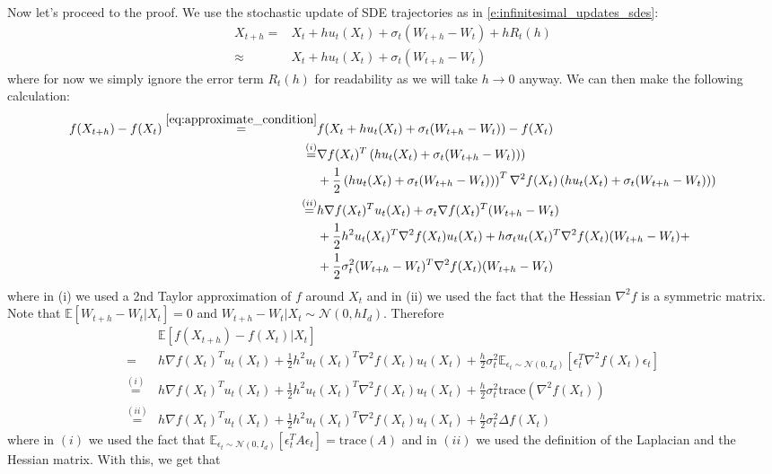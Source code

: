 Now let's proceed to the proof. We use the stochastic update of SDE trajectories as in \cref{e:infinitesimal_updates_sdes}:
\begin{align}
    X_{t+h} =& X_{t}+hu_t(X_t) + \sigma_t(W_{t+h}-W_{t})+hR_t(h)\\
    \label{eq:approximate_condition}
    \approx &X_{t}+hu_t(X_t) + \sigma_t(W_{t+h}-W_{t})
\end{align}
where for now we simply ignore the error term $R_t(h)$ for readability as we will take $h\to 0$ anyway. We can then make the following calculation:
\begin{align*}
f(X_{t+h})-f(X_t)\overset{\eqref{eq:approximate_condition}}{=}&f(X_{t}+hu_t(X_t) + \sigma_t(W_{t+h}-W_{t}))-f(X_t)\\
\overset{(i)}{=}&\nabla f(X_t)^T\left(hu_t(X_t) + \sigma_t(W_{t+h}-W_{t}))\right)\\&+\frac{1}{2}\left(hu_t(X_t) + \sigma_t(W_{t+h}-W_{t}))\right)^T\nabla^2 f(X_t)\left(hu_t(X_t) + \sigma_t(W_{t+h}-W_{t}))\right)\\
\overset{(ii)}{=}&h\nabla f(X_t)^Tu_t(X_t) + \sigma_t\nabla f(X_t)^T(W_{t+h}-W_{t})\\&+\frac{1}{2}h^2u_t(X_t)^T\nabla^2 f(X_t)u_t(X_t)+ h\sigma_tu_t(X_t)^T\nabla^2 f(X_t)(W_{t+h}-W_{t})+\\&+\frac{1}{2}\sigma_t^2(W_{t+h}-W_t)^T\nabla^2 f(X_t)(W_{t+h}-W_t)
\end{align*}
where in (i) we used a 2nd Taylor approximation of $f$ around $X_t$ and in (ii) we used the fact that the Hessian $\nabla^2 f$ is a symmetric matrix. Note that $\mathbb{E}[W_{t+h}-W_t|X_t]=0$ and $W_{t+h}-W_{t}|X_t\sim\mathcal{N}(0,hI_d)$. Therefore
\begin{align*}
    &\mathbb{E}[f(X_{t+h})-f(X_t)|X_t]\\
=&h\nabla f(X_t)^Tu_t(X_t)+\frac{1}{2}h^2u_t(X_t)^T\nabla^2 f(X_t)u_t(X_t)+\frac{h}{2}\sigma_t^2\mathbb{E}_{\epsilon_t\sim\mathcal{N}(0,I_d)}[\epsilon_t^T\nabla^2 f(X_t)\epsilon_t]\\
\overset{(i)}{=}&h\nabla f(X_t)^Tu_t(X_t)+\frac{1}{2}h^2u_t(X_t)^T\nabla^2 f(X_t)u_t(X_t)+\frac{h}{2}\sigma_t^2\text{trace}(\nabla^2 f(X_t))\\
\overset{(ii)}{=}&h\nabla f(X_t)^Tu_t(X_t)+\frac{1}{2}h^2u_t(X_t)^T\nabla^2 f(X_t)u_t(X_t)+\frac{h}{2}\sigma_t^2\Delta f(X_t)
\end{align*}
where in $(i)$ we used the fact that $\mathbb{E}_{\epsilon_t\sim\mathcal{N}(0,I_d)}[\epsilon_t^T A\epsilon_t]=\text{trace}(A)$ and in $(ii)$ we used the definition of the Laplacian and the Hessian matrix. With this, we get that 
